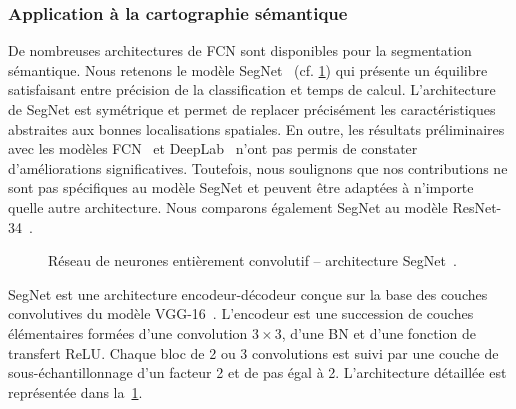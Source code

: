 \subsubsection{Application à la cartographie sémantique}


De nombreuses architectures de \gls{FCN} sont disponibles pour la segmentation sémantique. Nous retenons le modèle \gls{SegNet}~\cite{badrinarayanan_segnet_2017} (cf. \cref{fig:segnet}) qui présente un équilibre satisfaisant entre précision de la classification et temps de calcul. L'architecture de SegNet est symétrique et permet de replacer précisément les caractéristiques abstraites aux bonnes localisations spatiales. En outre, les résultats préliminaires avec les modèles \gls{FCN}~\cite{long_fully_2015} et DeepLab~\cite{chen_deeplab_2018} n'ont pas permis de constater d'améliorations significatives. Toutefois, nous soulignons que nos contributions ne sont pas spécifiques au modèle SegNet et peuvent être adaptées à n'importe quelle autre architecture. Nous comparons également SegNet au modèle \gls{ResNet}-34~\cite{he_deep_2016}.

\begin{figure}[ht]
	\resizebox{\textwidth}{!}{%
	
	}
	\caption[Réseau de neurones entièrement convolutif -- architecture SegNet.]{Réseau de neurones entièrement convolutif -- architecture SegNet~\cite{badrinarayanan_segnet_2017}.}
	\label{fig:segnet}
\end{figure}

SegNet est une architecture encodeur-décodeur conçue sur la base des couches convolutives du modèle \gls{VGG-16}~\cite{chatfield_return_2014,simonyan_very_2015}. L'encodeur est une succession de couches élémentaires formées d'une convolution $3\times3$, d'une \gls{BN} et d'une fonction de transfert \gls{ReLU}. Chaque bloc de 2 ou 3 convolutions est suivi par une couche de sous-échantillonnage d'un facteur 2 et de pas égal à 2. L'architecture détaillée est représentée dans la~\cref{fig:segnet}.

% 

